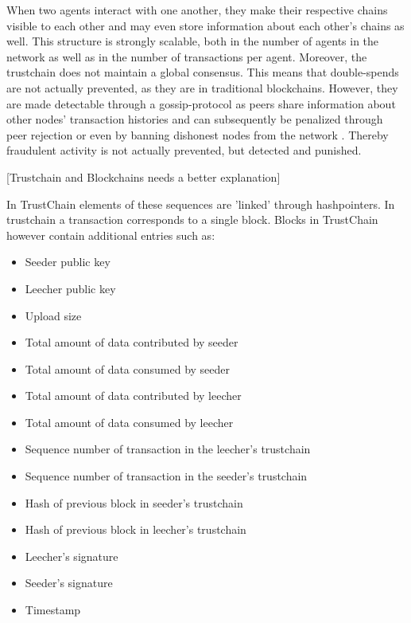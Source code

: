 \documentclass[11pt,a4paper]{report}
\theoremstyle{definition}
\theoremstyle{theorem}
\theoremstyle{proposition}
\theoremstyle{corollary}
\theoremstyle{lemma}
\theoremstyle{example}
\theoremstyle{remark}
\begin{document}
\noindent{}When two agents interact with one another, they make their respective chains visible to each other and may even store information about each other's chains as well. This structure is strongly scalable, both in the number of agents in the network as well as in the number of transactions per agent. Moreover, the trustchain does not maintain a global consensus. This means that double-spends are not actually prevented, as they are in traditional blockchains. However, they are made detectable through a gossip-protocol as peers share information about other nodes' transaction histories and can subsequently be penalized through peer rejection or even by banning dishonest nodes from the network \cite{TrustChain: A Sybil-resistant scalable blockchain}. Thereby fraudulent activity is not actually prevented, but detected and punished.\vspace{1em}\\

\noindent{}\begin{center} [Trustchain and Blockchains needs a better explanation] \vspace{1em}\\\end{center}
\noindent{}In TrustChain elements of these sequences are 'linked' through hashpointers. In trustchain a transaction corresponds to a single block. Blocks in TrustChain however contain additional entries such as:

\begin{itemize}
\item Seeder public key 
\item Leecher public key
\item Upload size
\item Total amount of data contributed by seeder
\item Total amount of data consumed by seeder
\item Total amount of data contributed by leecher
\item Total amount of data consumed by leecher
\item Sequence number of transaction in the leecher's trustchain
\item Sequence number of transaction in the seeder's trustchain
\item Hash of previous block in seeder's trustchain
\item Hash of previous block in leecher's trustchain
\item Leecher's signature
\item Seeder's signature
\item Timestamp
\end{itemize}
\end{document}
